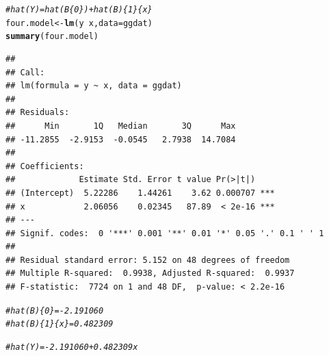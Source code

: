 \documentclass{article}\usepackage[]{graphicx}\usepackage[]{color}
\makeatletter
\newcommand{\hlcom}[1]{\textcolor[rgb]{0.678,0.584,0.686}{\textit{#1}}}%
\newcommand{\hlopt}[1]{\textcolor[rgb]{0,0,0}{#1}}%
\newcommand{\hlstd}[1]{\textcolor[rgb]{0.345,0.345,0.345}{#1}}%
\newcommand{\hlkwb}[1]{\textcolor[rgb]{0.69,0.353,0.396}{#1}}%
\newcommand{\hlkwc}[1]{\textcolor[rgb]{0.333,0.667,0.333}{#1}}%
\newcommand{\hlkwd}[1]{\textcolor[rgb]{0.737,0.353,0.396}{\textbf{#1}}}%
\newenvironment{kframe}{%
 \def\at@end@of@kframe{}%
 \ifinner\ifhmode%
  \def\at@end@of@kframe{\end{minipage}}%
  \begin{minipage}{\columnwidth}%
 \fi\fi%
 \def\FrameCommand##1{\hskip\@totalleftmargin \hskip-\fboxsep
 \colorbox{shadecolor}{##1}\hskip-\fboxsep
     \hskip-\linewidth \hskip-\@totalleftmargin \hskip\columnwidth}%
 \MakeFramed {\advance\hsize-\width
   \@totalleftmargin\z@ \linewidth\hsize
   \@setminipage}}%
 {\par\unskip\endMakeFramed%
 \at@end@of@kframe}
\newenvironment{knitrout}{}{} %
\makeatother
\begin{document}
\begin{enumerate}
\begin{enumerate}
\begin{knitrout}
\begin{kframe}
\begin{alltt}
\hlcom{#hat(Y)=hat(B\{0\})+hat(B)\{1\}\{x\}}
\hlstd{four.model}\hlkwb{<-}\hlkwd{lm}\hlstd{(y}\hlopt{~}\hlstd{x,} \hlkwc{data}\hlstd{=ggdat)}
\hlkwd{summary}\hlstd{(four.model)}
\end{alltt}
\begin{verbatim}
## 
## Call:
## lm(formula = y ~ x, data = ggdat)
## 
## Residuals:
##      Min       1Q   Median       3Q      Max 
## -11.2855  -2.9153  -0.0545   2.7938  14.7084 
## 
## Coefficients:
##             Estimate Std. Error t value Pr(>|t|)    
## (Intercept)  5.22286    1.44261    3.62 0.000707 ***
## x            2.06056    0.02345   87.89  < 2e-16 ***
## ---
## Signif. codes:  0 '***' 0.001 '**' 0.01 '*' 0.05 '.' 0.1 ' ' 1
## 
## Residual standard error: 5.152 on 48 degrees of freedom
## Multiple R-squared:  0.9938,	Adjusted R-squared:  0.9937 
## F-statistic:  7724 on 1 and 48 DF,  p-value: < 2.2e-16
\end{verbatim}
\begin{alltt}
\hlcom{#hat(B)\{0\}=-2.191060}
\hlcom{#hat(B)\{1\}\{x\}=0.482309}

\hlcom{#hat(Y)=-2.191060+0.482309x}


\end{alltt}
\end{kframe}
\end{knitrout}
\end{enumerate}
\end{enumerate}
\end{document}
